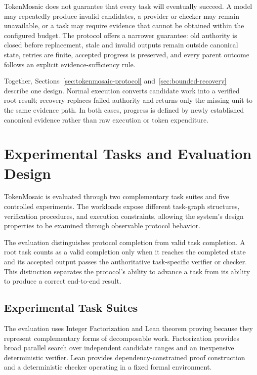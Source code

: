 \documentclass{article}
\theoremstyle{plain}
\begin{document}
TokenMosaic does not guarantee that every task will eventually succeed. A model may repeatedly produce invalid candidates, a provider or checker may remain unavailable, or a task may require evidence that cannot be obtained within the configured budget. The protocol offers a narrower guarantee: old authority is closed before replacement, stale and invalid outputs remain outside canonical state, retries are finite, accepted progress is preserved, and every parent outcome follows an explicit evidence-sufficiency rule.

Together, Sections~\ref{sec:tokenmosaic-protocol} and~\ref{sec:bounded-recovery} describe one design. Normal execution converts candidate work into a verified root result; recovery replaces failed authority and returns only the missing unit to the same evidence path. In both cases, progress is defined by newly established canonical evidence rather than raw execution or token expenditure.









\section{Experimental Tasks and Evaluation Design}
\label{sec:experimental-design}

TokenMosaic is evaluated through two complementary task suites and five
controlled experiments. The workloads expose different task-graph
structures, verification procedures, and execution constraints, allowing
the system's design properties to be examined through observable protocol
behavior.

The evaluation distinguishes protocol completion from valid task
completion. A root task counts as a valid completion only when it reaches
the completed state and its accepted output passes the authoritative
task-specific verifier or checker. This distinction separates the
protocol's ability to advance a task from its ability to produce a correct
end-to-end result.


\subsection{Experimental Task Suites}

The evaluation uses Integer Factorization and Lean theorem proving because
they represent complementary forms of decomposable work. Factorization
provides broad parallel search over independent candidate ranges and an
inexpensive deterministic verifier. Lean provides dependency-constrained
proof construction and a deterministic checker operating in a fixed
formal environment.
\end{document}
